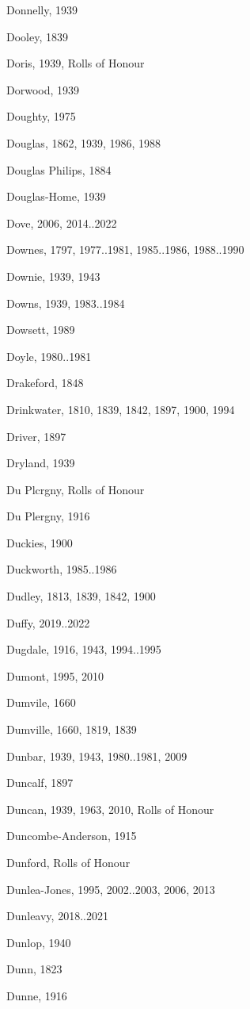 {\begin{theindex}
\item Donnelly, 1939
\item Dooley, 1839
\item Doris, 1939, Rolls of Honour
\item Dorwood, 1939
\item Doughty, 1975
\item Douglas, 1862, 1939, 1986, 1988
\item Douglas Philips, 1884
\item Douglas-Home, 1939
\item Dove, 2006, 2014..2022
\item Downes, 1797, 1977..1981, 1985..1986, 1988..1990
\item Downie, 1939, 1943
\item Downs, 1939, 1983..1984
\item Dowsett, 1989
\item Doyle, 1980..1981
\item Drakeford, 1848
\item Drinkwater, 1810, 1839, 1842, 1897, 1900, 1994
\item Driver, 1897
\item Dryland, 1939
\item Du Plcrgny, Rolls of Honour
\item Du Plergny, 1916
\item Duckies, 1900
\item Duckworth, 1985..1986
\item Dudley, 1813, 1839, 1842, 1900
\item Duffy, 2019..2022
\item Dugdale, 1916, 1943, 1994..1995
\item Dumont, 1995, 2010
\item Dumvile, 1660
\item Dumville, 1660, 1819, 1839
\item Dunbar, 1939, 1943, 1980..1981, 2009
\item Duncalf, 1897
\item Duncan, 1939, 1963, 2010, Rolls of Honour
\item Duncombe-Anderson, 1915
\item Dunford, Rolls of Honour
\item Dunlea-Jones, 1995, 2002..2003, 2006, 2013
\item Dunleavy, 2018..2021
\item Dunlop, 1940
\item Dunn, 1823
\item Dunne, 1916

\end{theindex}}
